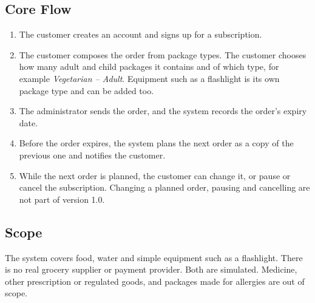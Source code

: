 \documentclass[a4paper,11pt]{article}
\begin{document}
\subsection*{Core Flow}
\begin{enumerate}[nosep]
  \item The customer creates an account and signs up for a subscription.
  \item The customer composes the order from package types. The customer chooses how many adult and child packages it contains and of which type, for example \emph{Vegetarian -- Adult}. Equipment such as a flashlight is its own package type and can be added too.
  \item The administrator sends the order, and the system records the order's expiry date.
  \item Before the order expires, the system plans the next order as a copy of the previous one and notifies the customer.
  \item While the next order is planned, the customer can change it, or pause or cancel the subscription. Changing a planned order, pausing and cancelling are not part of version 1.0.
\end{enumerate}

\subsection*{Scope}
The system covers food, water and simple equipment such as a flashlight. There is no
real grocery supplier or payment provider. Both are simulated. Medicine, other
prescription or regulated goods, and packages made for allergies are out of scope.

\printbibliography[heading=bibintoc]
\end{document}
